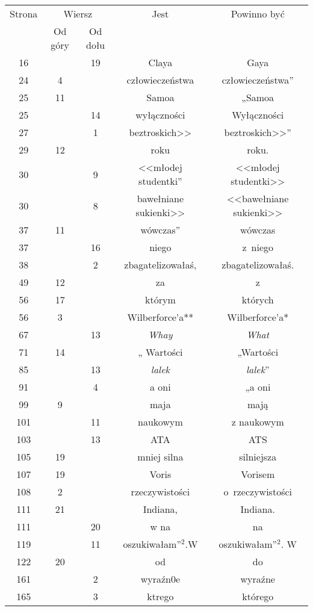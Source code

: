\documentclass[a4paper,11pt]{article}
\begin{document}
\begin{center}

  \begin{tabular}{|c|c|c|c|c|}
    \hline
    Strona & \multicolumn{2}{c|}{Wiersz} & Jest
                              & Powinno być \\ \cline{2-3}
    & Od góry & Od dołu & & \\
    \hline
    16  & & 19 & Claya & Gaya \\
    24  &  4 & & człowieczeństwa & człowieczeństwa” \\
    25  & 11 & & Samoa & „Samoa \\
    25  & & 14 & wyłączności & Wyłączności \\
    27  & &  1 & beztroskich>> & beztroskich>>” \\
    29  & 12 & & roku & roku. \\
    30  & &  9 & <<młodej studentki” %
           & <<młodej studentki>> \\
    30  & &  8 & bawełniane sukienki>> & <<bawełniane sukienki>> \\
    37  & 11 & & wówczas” & wówczas \\
    37  & & 16 & niego & z~niego \\
    38  & &  2 & zbagatelizowałaś, & zbagatelizowałaś. \\
    49  & 12 & & za & z \\
    56  & 17 & & którym & których \\
    56  &  3 & & Wilberforce'a** & Wilberforce'a* \\
    67  & & 13 & \textit{Whay} & \textit{What} \\
    71  & 14 & & „ Wartości & „Wartości \\
    85  & & 13 & \textit{lalek} & \textit{lalek}” \\
    91  & &  4 & a oni & „a oni \\
    99  &  9 & & maja & mają \\
    101 & & 11 & naukowym & z naukowym \\
    103 & & 13 & ATA & ATS \\
    105 & 19 & & mniej silna & silniejsza \\
    107 & 19 & & Voris & Vorisem \\
    108 &  2 & & rzeczywistości & o~rzeczywistości \\
    111 & 21 & & Indiana, & Indiana. \\
    111 & & 20 & w na & na \\
    119 & & 11 & oszukiwałam”$^{ 2 }$.W & oszukiwałam”$^{ 2 }$. W \\
    122 & 20 & & od & do \\
    161 & &  2 & wyraźn0e & wyraźne \\
    165 & &  3 & ktrego & którego \\
    \hline
  \end{tabular}






\end{center}
\end{document}
